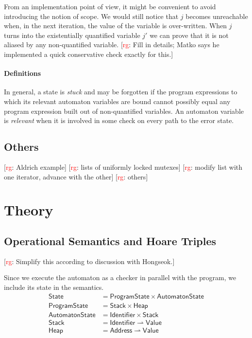 \documentclass[a4paper]{article}
\newcommand{\todo}[2]{{\small [\textcolor{red}{#1}: #2]}}
\newcommand{\rg}[1]{\todo{rg}{#1}}
\newcommand{\pmap}{\rightharpoonup}
\theoremstyle{remark}
\begin{document}
From an implementation point of view, it might be convenient to avoid introducing the notion of scope.
We would still notice that $j$ becomes unreachable when, in the next iteration, the value of the variable is over-written.
When $j$ turns into the existentially quantified variable $j'$ we can prove that it is not aliased by any non-quantified variable.
\rg{Fill in details; Matko says he implemented a quick conservative check exactly for this.}

\paragraph{Definitions}
In general, a state is \emph{stuck} and may be forgotten if the program expressions to which its relevant automaton variables are bound cannot possibly equal any program expression built out of non-quantified variables.
An automaton variable is \emph{relevant} when it is involved in some check on every path to the error state.

\subsection{Others} %

\rg{Aldrich example}
\rg{lists of uniformly locked mutexes}
\rg{modify list with one iterator, advance with the other}
\rg{others}
 
\section{Theory} %
\subsection{Operational Semantics and Hoare Triples}\label{sec:opsem} %

\rg{Simplify this according to discussion with Hongseok.}

Since we execute the automaton as a checker in parallel with the program, we include its state in the semantics.
\begin{align}
\mathsf{State}&=\mathsf{ProgramState}\times\mathsf{AutomatonState} \\
\mathsf{ProgramState}&=\mathsf{Stack}\times\mathsf{Heap} \\
\mathsf{AutomatonState}&=\mathsf{Identifier}\times\mathsf{Stack} \\
\mathsf{Stack}&=\mathsf{Identifier}\pmap\mathsf{Value} \\
\mathsf{Heap}&=\mathsf{Address}\pmap\mathsf{Value}
\end{align}
\end{document}
